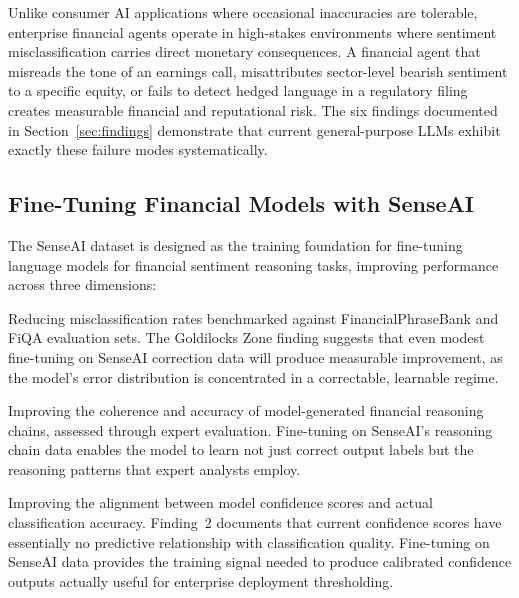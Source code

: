 \documentclass[11pt,a4paper]{article}
\begin{document}
Unlike consumer AI applications where occasional inaccuracies are tolerable,
enterprise financial agents operate in high-stakes environments where sentiment
misclassification carries direct monetary consequences. A financial agent that
misreads the tone of an earnings call, misattributes sector-level bearish sentiment to
a specific equity, or fails to detect hedged language in a regulatory filing creates
measurable financial and reputational risk. The six findings documented in
Section~\ref{sec:findings} demonstrate that current general-purpose LLMs exhibit
exactly these failure modes systematically.

\medskip
\noindent{}

\subsection{Fine-Tuning Financial Models with SenseAI}

The SenseAI dataset is designed as the training foundation for fine-tuning language
models for financial sentiment reasoning tasks, improving performance across three
dimensions:

\begin{description}[leftmargin=2em, style=nextline,
                    font=\bfseries\color{darkblue}]

  \item[Sentiment accuracy.]
    Reducing misclassification rates benchmarked against FinancialPhraseBank and
    FiQA evaluation sets. The Goldilocks Zone finding suggests that even modest
    fine-tuning on SenseAI correction data will produce measurable improvement, as
    the model's error distribution is concentrated in a correctable, learnable regime.

  \item[Reasoning quality.]
    Improving the coherence and accuracy of model-generated financial reasoning
    chains, assessed through expert evaluation. Fine-tuning on SenseAI's reasoning
    chain data enables the model to learn not just correct output labels but the
    reasoning patterns that expert analysts employ.

  \item[Confidence calibration.]
    Improving the alignment between model confidence scores and actual classification
    accuracy. Finding~2 documents that current confidence scores have essentially no
    predictive relationship with classification quality. Fine-tuning on SenseAI data
    provides the training signal needed to produce calibrated confidence outputs
    actually useful for enterprise deployment thresholding.

\end{description}
\end{document}
